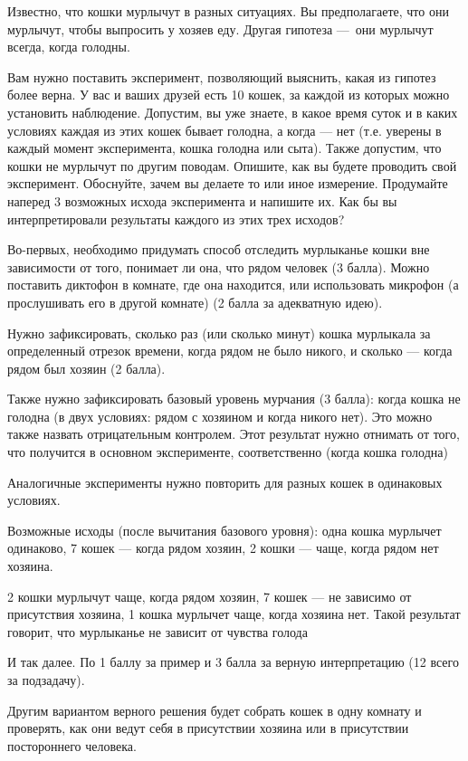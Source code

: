 
Известно, что кошки мурлычут в разных ситуациях. Вы предполагаете, что они мурлычут, чтобы выпросить у хозяев еду. Другая гипотеза — они мурлычут всегда, когда голодны.

Вам нужно поставить эксперимент, позволяющий выяснить, какая из гипотез более верна. У вас и ваших друзей есть 10 кошек, за каждой из которых можно установить наблюдение. Допустим, вы уже знаете, в какое время суток и в каких условиях каждая из этих кошек бывает голодна, а когда — нет (т.е. уверены в каждый момент эксперимента, кошка голодна или сыта). Также допустим, что кошки не мурлычут по другим поводам. Опишите, как вы будете проводить свой эксперимент. Обоснуйте, зачем вы делаете то или иное измерение. Продумайте наперед 3 возможных исхода эксперимента и напишите их. Как бы вы интерпретировали результаты каждого из этих трех исходов?

\solutionSection

Во-первых, необходимо придумать способ отследить мурлыканье кошки вне зависимости от того, понимает ли она, что рядом человек (3 балла). Можно поставить диктофон в комнате, где она находится, или использовать микрофон (а прослушивать его в другой комнате) (2 балла за адекватную идею). 

Нужно зафиксировать, сколько раз (или сколько минут) кошка мурлыкала за определенный отрезок времени, когда рядом не было никого, и сколько — когда рядом был хозяин (2 балла).

Также нужно зафиксировать базовый уровень мурчания (3 балла): когда кошка не голодна (в двух условиях: рядом с хозяином и когда никого нет). Это можно также назвать  отрицательным контролем. Этот результат нужно отнимать от того, что получится в основном эксперименте, соответственно (когда кошка голодна)

Аналогичные эксперименты нужно повторить для разных кошек в одинаковых условиях. 

Возможные исходы (после вычитания базового уровня): одна кошка мурлычет одинаково, 7 кошек — когда рядом хозяин, 2 кошки — чаще, когда рядом нет хозяина. 

2 кошки мурлычут чаще, когда рядом хозяин, 7 кошек — не зависимо от присутствия хозяина, 1 кошка мурлычет чаще, когда хозяина нет. Такой результат говорит, что мурлыканье не зависит от чувства голода

И так далее. По 1 баллу за пример и 3 балла за верную интерпретацию (12 всего за подзадачу). 

Другим вариантом верного решения будет собрать кошек в одну комнату и проверять, как они ведут себя в присутствии хозяина или в присутствии постороннего человека. 